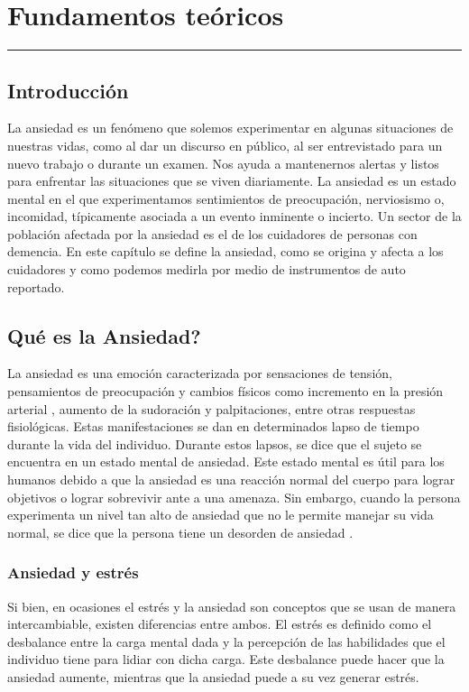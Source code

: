 \chapter{Fundamentos te\'oricos}\label{capit:cap2}
\vspace{-2.0325ex}%
\noindent
\rule{\textwidth}{0.5pt}
\vspace{-5.5ex}%
\newcommand{\pushline}{\Indp}%

\section{Introducci\'on}\label{secc:introduccion}
La ansiedad es un fen\'omeno que solemos experimentar en algunas situaciones de nuestras vidas, como  al dar un discurso en p\'ublico, al ser entrevistado para un nuevo trabajo o durante un examen. Nos ayuda a mantenernos alertas y listos para enfrentar las situaciones que se viven diariamente. La ansiedad es un estado mental en el que experimentamos sentimientos de preocupaci\'on, nerviosismo o, incomidad, t\'ipicamente asociada a un evento inminente o incierto. Un sector de la poblaci\'on afectada por la ansiedad es el de los cuidadores de personas con demencia. En este cap\'itulo se define la ansiedad, como se origina y afecta a los cuidadores y como podemos medirla por medio de instrumentos de auto reportado.

\section{Qu\'e es la Ansiedad?}\label{secc:ansiedad}

	La ansiedad es una emoci\'on caracterizada por sensaciones de tensi\'on, pensamientos de preocupaci\'on y cambios f\'isicos como incremento en la presi\'on arterial \citep{psychologyapa}, aumento de la sudoraci\'on y palpitaciones, entre otras respuestas fisiol\'ogicas. Estas manifestaciones se dan en determinados lapso de tiempo durante la vida del individuo. Durante estos lapsos, se dice que el sujeto se encuentra en un estado mental de ansiedad. Este estado mental es \'util para los humanos debido a que la ansiedad es una reacci\'on normal del cuerpo para lograr objetivos o lograr sobrevivir ante a una amenaza. Sin embargo, cuando la persona experimenta un nivel tan alto de ansiedad que no le permite manejar su vida normal, se dice que la persona tiene un desorden de ansiedad \citep{repetto2013}. 

\subsection{Ansiedad y estr\'es}\label{secc:anxietyandstress}
Si bien, en ocasiones el estr\'es y la ansiedad son conceptos que se usan de manera intercambiable, existen diferencias entre ambos. El estr\'es es definido como el desbalance entre la carga mental dada y la percepci\'on de las habilidades que el individuo tiene para lidiar con dicha carga. Este desbalance puede hacer que la ansiedad aumente, mientras que la ansiedad puede a su vez generar estr\'es. %



